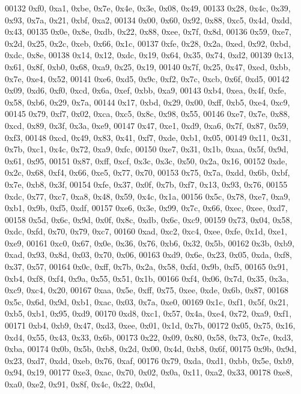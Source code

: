 \begin{DoxyCode}
00132   0xf0, 0xa1, 0xbe, 0x7e, 0x4e, 0x3e, 0x08, 0x49,
00133   0x28, 0x4c, 0x39, 0x93, 0x7a, 0x21, 0xbf, 0xa2,
00134   0x00, 0x60, 0x92, 0x88, 0xc5, 0x4d, 0xdd, 0x43,
00135   0x0e, 0x8e, 0xdb, 0x22, 0x88, 0xee, 0x7f, 0x8d,
00136   0x59, 0xe7, 0x2d, 0x25, 0x2c, 0xeb, 0x66, 0x1c,
00137   0xfe, 0x28, 0x2a, 0xed, 0x92, 0xbd, 0xdc, 0x8e,
00138   0x14, 0x12, 0xdc, 0x19, 0x64, 0x35, 0x74, 0xd2,
00139   0x13, 0x61, 0x8f, 0xb0, 0x68, 0xa9, 0x25, 0x19,
00140   0x7f, 0x25, 0x47, 0xed, 0xbb, 0x7e, 0xe4, 0x52,
00141   0xe6, 0xd5, 0x9c, 0xf2, 0x7c, 0xcb, 0x6f, 0xd5,
00142   0x09, 0xd6, 0xf0, 0xcd, 0x6a, 0xef, 0xbb, 0xa9,
00143   0xb4, 0xea, 0x4f, 0xfe, 0x58, 0xb6, 0x29, 0x7a,
00144   0x17, 0xbd, 0x29, 0x00, 0xff, 0xb5, 0xe4, 0xc9,
00145   0x79, 0xf7, 0x02, 0xca, 0xc5, 0x8c, 0x98, 0x55,
00146   0xe7, 0x7e, 0x88, 0xcd, 0x89, 0x3f, 0x3a, 0xe9,
00147   0x47, 0xe1, 0xd9, 0xa6, 0x7f, 0x87, 0x59, 0xf3,
00148   0xcd, 0x49, 0x83, 0x41, 0xf7, 0xde, 0xb1, 0x05,
00149   0x11, 0x31, 0x7b, 0xc1, 0x4c, 0x72, 0xa9, 0xfc,
00150   0xe7, 0x31, 0x1b, 0xaa, 0x5f, 0x9d, 0x61, 0x95,
00151   0x87, 0xff, 0xcf, 0x3c, 0x3c, 0x50, 0x2a, 0x16,
00152   0xde, 0x2c, 0x68, 0xf4, 0x66, 0xe5, 0x77, 0x70,
00153   0x75, 0x7a, 0xdd, 0x6b, 0xbf, 0x7e, 0xb8, 0x3f,
00154   0xfe, 0x37, 0x0f, 0x7b, 0xf7, 0x13, 0x93, 0x76,
00155   0xdc, 0x77, 0xc7, 0xa8, 0x48, 0x59, 0x4c, 0x1a,
00156   0x5c, 0x78, 0xe7, 0xa9, 0xb1, 0x9b, 0xf5, 0xdf,
00157   0xe6, 0x3e, 0x99, 0x7c, 0x66, 0xec, 0xee, 0xd7,
00158   0x5d, 0x6c, 0x9d, 0x0f, 0x8c, 0xdb, 0x6c, 0xc9,
00159   0x73, 0x04, 0x58, 0xdc, 0xfd, 0x70, 0x79, 0xc7,
00160   0xad, 0xc2, 0xc4, 0xee, 0xfe, 0x1d, 0xe1, 0xe9,
00161   0xc0, 0x67, 0x0e, 0x36, 0x76, 0xb6, 0x32, 0x5b,
00162   0x3b, 0xb9, 0xad, 0x93, 0x8d, 0x03, 0x70, 0x06,
00163   0xd9, 0x6e, 0x23, 0x05, 0xda, 0xf8, 0x37, 0x57,
00164   0x0c, 0xff, 0x7b, 0x2a, 0x58, 0xfd, 0x9b, 0xf5,
00165   0x91, 0xb4, 0xf8, 0xf4, 0x9a, 0x55, 0x51, 0x1b,
00166   0xf4, 0x06, 0x7d, 0x35, 0x3a, 0xc9, 0xc4, 0x20,
00167   0xaa, 0x5e, 0xff, 0x75, 0xee, 0xde, 0x6b, 0x87,
00168   0x5c, 0x6d, 0x9d, 0xb1, 0xac, 0x03, 0x7a, 0xe0,
00169   0x1c, 0xf1, 0x5f, 0x21, 0xb5, 0xb1, 0x95, 0xd9,
00170   0xd8, 0xc1, 0x57, 0x4a, 0xe4, 0x72, 0xa9, 0xf1,
00171   0xb4, 0xb9, 0x47, 0xd3, 0xee, 0x01, 0x1d, 0x7b,
00172   0x05, 0x75, 0x16, 0xd4, 0x55, 0x43, 0x33, 0x6b,
00173   0x22, 0x09, 0x80, 0x58, 0x73, 0x7e, 0xd3, 0xba,
00174   0x0b, 0x5b, 0xb8, 0x2d, 0x00, 0x4d, 0xb8, 0x6f,
00175   0x9b, 0x9d, 0x23, 0xd7, 0xdd, 0xeb, 0x76, 0xaf,
00176   0x79, 0xda, 0xd1, 0xbb, 0x5e, 0xb9, 0x94, 0x19,
00177   0xe3, 0xac, 0x70, 0x02, 0x0a, 0x11, 0xa2, 0x33,
00178   0xe8, 0xa0, 0xe2, 0x91, 0x8f, 0x4c, 0x22, 0x0d,

\end{DoxyCode}
